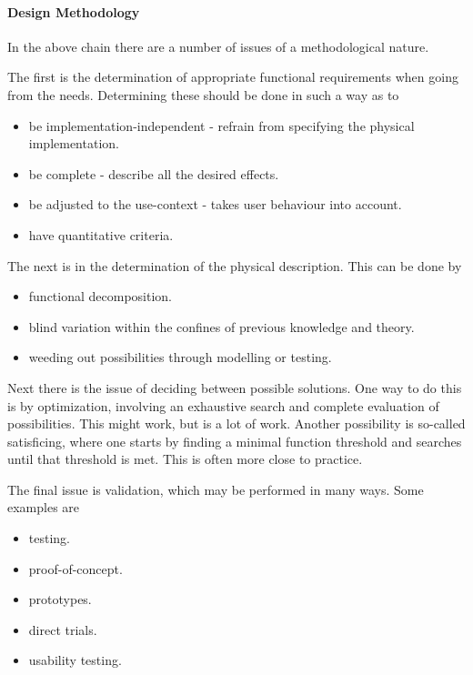 \paragraph{Design Methodology}
In the above chain there are a number of issues of a methodological nature.

The first is the determination of appropriate functional requirements when going from the needs. Determining these should be done in such a way as to
\begin{itemize}
	\item be implementation-independent - refrain from specifying the physical implementation.
	\item be complete - describe all the desired effects.
	\item be adjusted to the use-context - takes user behaviour into account.
	\item have quantitative criteria.
\end{itemize}

The next is in the determination of the physical description. This can be done by
\begin{itemize}
	\item functional decomposition.
	\item blind variation within the confines of previous knowledge and theory.
	\item weeding out possibilities through modelling or testing.
\end{itemize}

Next there is the issue of deciding between possible solutions. One way to do this is by optimization, involving an exhaustive search and complete evaluation of possibilities. This might work, but is a lot of work. Another possibility is so-called satisficing, where one starts by finding a minimal function threshold and searches until that threshold is met. This is often more close to practice.

The final issue is validation, which may be performed in many ways. Some examples are
\begin{itemize}
	\item testing.
	\item proof-of-concept.
	\item prototypes.
	\item direct trials.
	\item usability testing.
\end{itemize}

